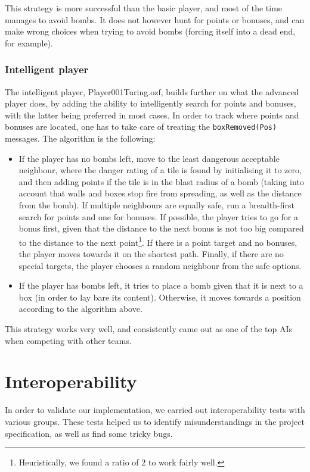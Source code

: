 \documentclass[12pt,journal]{IEEEtran}
\newcommand{\ntt}{\normalfont\ttfamily}
\newcommand{\fn}[1]{{\protect\ntt#1}}
\begin{document}
This strategy is more successful than the basic player, and most of the time manages to avoid bombs.
It does not however hunt for points or bonuses, and can make wrong choices when trying to avoid bombs (forcing itself into a dead end, for example).

\subsubsection{Intelligent player}
The intelligent player, \fn{Player001Turing.ozf}, builds further on what the advanced player does, by adding the ability to intelligently search for points and bonuses, with the latter being preferred in most cases.
In order to track where points and bonuses are located, one has to take care of treating the \lstinline|boxRemoved(Pos)| messages.
The algorithm is the following:
\begin{itemize}
	\item If the player has no bombs left, move to the least dangerous acceptable neighbour, where the danger rating of a tile is found by initialising it to zero, and then adding points if the tile is in the blast radius of a bomb (taking into account that walls and boxes stop fire from spreading, as well as the distance from the bomb).
	If multiple neighbours are equally safe, run a breadth-first search for points and one for bonuses.
	If possible, the player tries to go for a bonus first, given that the distance to the next bonus is not too big compared to the distance to the next point\footnote{Heuristically, we found a ratio of \(2\) to work fairly well.}.
	If there is a point target and no bonuses, the player moves towards it on the shortest path.
	Finally, if there are no special targets, the player chooses a random neighbour from the safe options.
	\item If the player has bombs left, it tries to place a bomb given that it is next to a box (in order to lay bare its content).
	Otherwise, it moves towards a position according to the algorithm above.
\end{itemize}

This strategy works very well, and consistently came out as one of the top AIs when competing with other teams.

\section{Interoperability}
In order to validate our implementation, we carried out interoperability tests with various groups.
These tests helped us to identify misunderstandings in the project specification, as well as find some tricky bugs.
\end{document}
